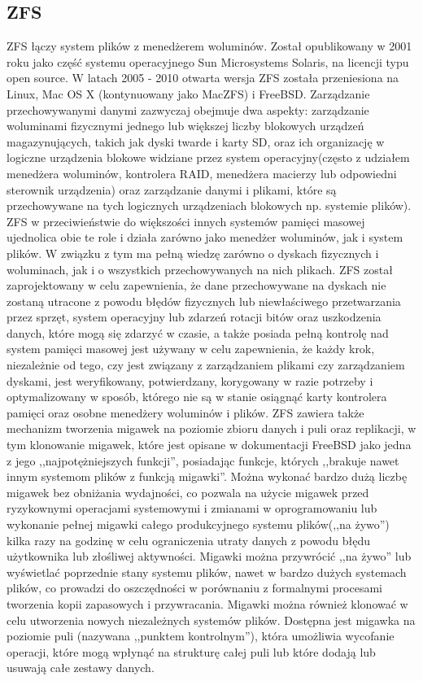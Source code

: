 \documentclass[12pt,a4paper]{article}
\begin{document}
		\subsection{ZFS}
		\indent ZFS łączy system plików z menedżerem woluminów. Został opublikowany w 2001 roku jako część systemu operacyjnego Sun Microsystems Solaris, na licencji typu open source.
			W latach 2005 - 2010 otwarta wersja ZFS została przeniesiona na Linux, Mac OS X (kontynuowany jako MacZFS) i FreeBSD.
			Zarządzanie przechowywanymi danymi zazwyczaj obejmuje dwa aspekty: zarządzanie woluminami fizycznymi jednego lub większej liczby blokowych urządzeń magazynujących, takich jak dyski
			twarde i karty SD, oraz ich organizację w logiczne urządzenia blokowe widziane przez system operacyjny(często z udziałem menedżera woluminów, kontrolera RAID, menedżera macierzy
			lub odpowiedni sterownik urządzenia) oraz zarządzanie danymi i plikami, które są przechowywane na tych logicznych urządzeniach blokowych np. systemie plików). ZFS w
			przeciwieństwie do większości innych systemów pamięci masowej ujednolica obie te role i działa zarówno jako menedżer woluminów, jak i system plików. W związku
			z tym ma pełną wiedzę zarówno o dyskach fizycznych i woluminach, jak i o wszystkich przechowywanych na nich plikach. ZFS został zaprojektowany w celu zapewnienia, że dane
			przechowywane na dyskach nie zostaną utracone z powodu błędów fizycznych lub niewłaściwego przetwarzania przez sprzęt, system operacyjny lub zdarzeń rotacji bitów oraz uszkodzenia
			danych, które mogą się zdarzyć w czasie, a także posiada pełną kontrolę nad system pamięci masowej jest używany w celu zapewnienia, że każdy krok, niezależnie od tego,
			czy jest związany z zarządzaniem plikami czy zarządzaniem dyskami, jest weryfikowany, potwierdzany, korygowany w razie potrzeby i optymalizowany w sposób, którego nie są
			w stanie osiągnąć karty kontrolera pamięci oraz osobne menedżery woluminów i plików. ZFS zawiera także mechanizm tworzenia migawek na poziomie zbioru danych i puli oraz
			replikacji, w tym klonowanie migawek, które jest opisane w dokumentacji FreeBSD jako jedna z jego ,,najpotężniejszych funkcji'', posiadając funkcje, których
			,,brakuje nawet innym systemom plików z funkcją migawki''. Można wykonać bardzo dużą liczbę migawek bez obniżania wydajności, co pozwala na użycie migawek przed
			ryzykownymi operacjami systemowymi i zmianami w oprogramowaniu lub wykonanie pełnej migawki całego produkcyjnego systemu plików(,,na żywo'') kilka razy na godzinę w celu
			ograniczenia utraty danych z powodu błędu użytkownika lub złośliwej aktywności. Migawki można przywrócić ,,na żywo'' lub wyświetlać poprzednie stany systemu plików, nawet
			w bardzo dużych systemach plików, co prowadzi do oszczędności w porównaniu z formalnymi procesami tworzenia kopii zapasowych i przywracania. Migawki można również klonować
			w celu utworzenia nowych niezależnych systemów plików. Dostępna jest migawka na poziomie puli (nazywana ,,punktem kontrolnym''), która umożliwia wycofanie operacji, które mogą
			wpłynąć na strukturę całej puli lub które dodają lub usuwają całe zestawy danych.
			
\end{document}
